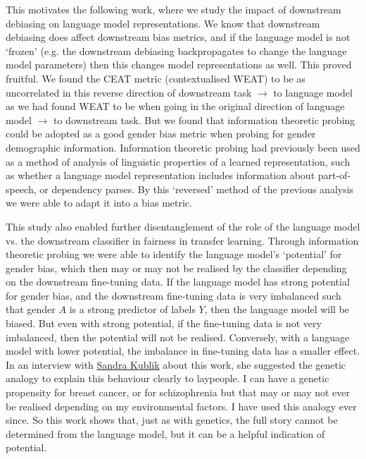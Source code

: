 This motivates the following work, where we study the impact of downstream debiasing on language model representations. We know that downstream debiasing does affect downstream bias metrics, and if the language model is not `frozen' (e.g. the downstream debiasing backpropagates to change the language model parameters) then this changes model representations as well. This proved fruitful. We found the CEAT metric (contextualised WEAT) to be as uncorrelated in this reverse direction of downstream task $\rightarrow$ to language model as we had found WEAT to be when going in the original direction of language model $\rightarrow$ to downstream task. But we found that information theoretic probing could be adopted as a good gender bias metric when probing for gender demographic information. Information theoretic probing had previously been used as a method of analysis of linguistic properties of a learned representation, such as whether a language model representation includes information about part-of-speech, or dependency parses. By this `reversed' method of the previous analysis we were able to adapt it into a bias metric.

This study also enabled further disentanglement of the role of the language model vs. the downstream classifier in fairness in transfer learning. Through information theoretic probing we were able to identify the language model's `potential' for gender bias, which then may or may not be realised by the classifier depending on the downstream fine-tuning data. If the language model has strong potential for gender bias, and the downstream fine-tuning data is very imbalanced such that gender $A$ is a strong predictor of labels $Y$, then the language model will be biased. But even with strong potential, if the fine-tuning data is not very imbalanced, then the potential will not be realised. Conversely, with a language model with lower potential, the imbalance in fine-tuning data has a smaller effect. In an interview with \href{https://about.me/sandra_kublik}{Sandra Kublik} about this work, she suggested the genetic analogy to explain this behaviour clearly to laypeople. I can have a genetic propensity for breast cancer, or for schizophrenia but that may or may not ever be realised depending on my environmental factors. I have used this analogy ever since. So this work shows that, just as with genetics, the full story cannot be determined from the language model, but it can be a helpful indication of potential.

